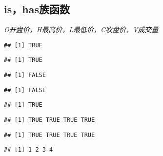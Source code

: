 \subsection{is，has族函数}
\em{O}开盘价，\em{H}最高价，\em{L}最低价，\em{C}收盘价，\em{V}成交量
\begin{knitrout}
\color{fgcolor}\begin{kframe}
\begin{alltt}
\end{alltt}
\begin{verbatim}
## [1] TRUE
\end{verbatim}
\begin{alltt}
\end{alltt}
\begin{verbatim}
## [1] TRUE
\end{verbatim}
\begin{alltt}
\end{alltt}
\begin{verbatim}
## [1] FALSE
\end{verbatim}
\begin{alltt}
\end{alltt}
\begin{verbatim}
## [1] FALSE
\end{verbatim}
\begin{alltt}
\end{alltt}
\begin{verbatim}
## [1] TRUE
\end{verbatim}
\end{kframe}
\end{knitrout}
\begin{knitrout}
\color{fgcolor}\begin{kframe}
\begin{alltt}
\end{alltt}
\begin{verbatim}
## [1] TRUE TRUE TRUE TRUE
\end{verbatim}
\begin{alltt}
  \hlstd{=} \hlstd{)}
\end{alltt}
\begin{verbatim}
## [1] TRUE TRUE TRUE TRUE
\end{verbatim}
\begin{alltt}
  \hlstd{=} \hlstd{)}
\end{alltt}
\begin{verbatim}
## [1] 1 2 3 4
\end{verbatim}
\end{kframe}
\end{knitrout}
